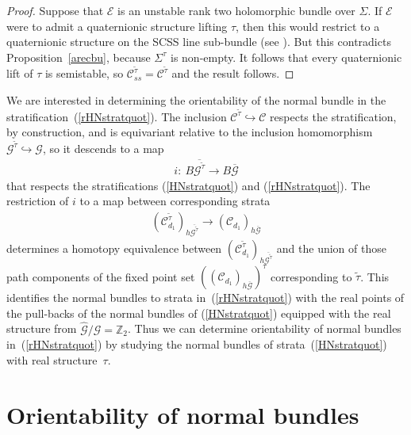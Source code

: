 \documentclass[pdftex]{sigma}
\numberwithin{equation}{section}
\begin{document}
\begin{proof}
Suppose that ${\mathcal E}$ is an unstable rank two holomorphic bundle over $\Sigma$. If ${\mathcal E}$ were to admit a quaternionic structure lifting $\tau$, then this would restrict to a quaternionic structure on the SCSS line sub-bundle (see \cite[Section~2.2]{B}). But this contradicts Proposition~\ref{arecbu}, because $\Sigma^{\tau}$ is non-empty. It follows that every quaternionic lift of $\tau$ is semistable, so ${\mathcal C}^{\tilde{\tau}}_{ss} = {\mathcal C}^{\tilde{\tau}}$ and the result follows.
\end{proof}

We are interested in determining the orientability of the normal bundle in the stratif\/ica\-tion~(\ref{rHNstratquot}). The inclusion ${\mathcal C}^{\tilde{\tau}} \hookrightarrow {\mathcal C}$ respects the stratif\/ication, by construction, and is equivariant relative to the inclusion homomorphism ${\mathcal G}^{\tilde{\tau}} \hookrightarrow {\mathcal G}$, so it descends to a map
\begin{gather*} i\colon \ B \overline{{\mathcal G}^{\tilde{\tau}}} \rightarrow B\overline{{\mathcal G}}\end{gather*}
that respects the stratif\/ications (\ref{HNstratquot}) and (\ref{rHNstratquot}). The restriction of $i$ to a map between corresponding strata \begin{gather*}({\mathcal C}_{d_1}^{\tilde{\tau}})_{h\overline{{\mathcal G}^{\tilde{\tau}}}} \rightarrow ({\mathcal C}_{d_1})_{h\overline{{\mathcal G}}}\end{gather*} determines a homotopy equivalence between $({\mathcal C}_{d_1}^{\tilde{\tau}})_{h\overline{{\mathcal G}^{\tilde{\tau}}}}$ and the union of those path components of the f\/ixed point set $(({\mathcal C}_{d_1})_{h\overline{{\mathcal G}}})^{\tau}$ corresponding to $\tilde{\tau}$. This identif\/ies the normal bundles to strata in~(\ref{rHNstratquot}) with the real points of the pull-backs of the normal bundles of (\ref{HNstratquot}) equipped with the real structure from $\hat{{\mathcal G}}/{\mathcal G} = {\mathbb Z}_2$. Thus we can determine orientability of normal bundles in~(\ref{rHNstratquot}) by studying the normal bundles of strata~(\ref{HNstratquot}) with real structure~$\tau$.

\section{Orientability of normal bundles}\label{ornormbund}
\end{document}
